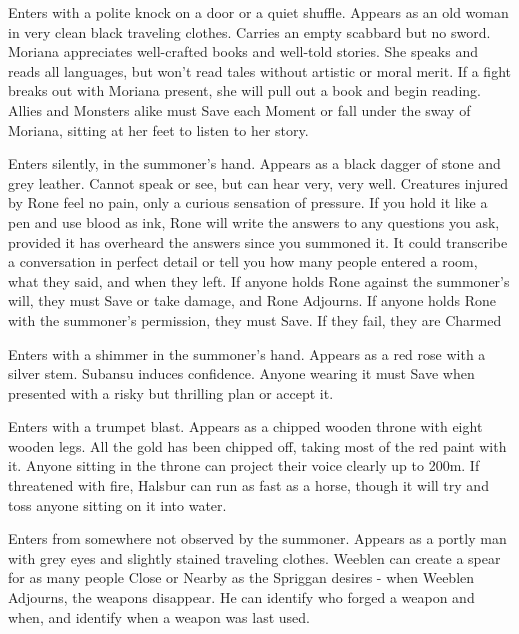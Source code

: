 {
Enters with a polite knock on a door or a quiet shuffle. Appears as an old woman in very clean black traveling clothes. Carries an empty scabbard but no sword. Moriana appreciates well-crafted books and well-told stories. She speaks and reads all languages, but won't read tales without artistic or moral merit. If a fight breaks out with Moriana present, she will pull out a book and begin reading. Allies and Monsters alike must Save each Moment or fall under the sway of Moriana, sitting at her feet to listen to her story.




Enters silently, in the summoner's hand. Appears as a black dagger of stone and grey leather. Cannot speak or see, but can hear very, very well. Creatures injured by Rone feel no pain, only a curious sensation of pressure. If you hold it like a pen and use blood as ink, Rone will write the answers to any questions you ask, provided it has overheard the answers since you summoned it. It could transcribe a conversation in perfect detail or tell you how many people entered a room, what they said, and when they left. If anyone holds Rone against the summoner's will, they must Save or take \SUMDICE damage, and Rone Adjourns. If anyone holds Rone with the summoner's permission, they must Save. If they fail, they are Charmed

Enters with a shimmer in the summoner's hand. Appears as a red rose with a silver stem. Subansu induces confidence. Anyone wearing it must Save when presented with a risky but thrilling plan or accept it. 


Enters with a trumpet blast. Appears as a chipped wooden throne with eight wooden legs. All the gold has been chipped off, taking most of the red paint with it. Anyone sitting in the throne can project their voice clearly up to 200m.  If threatened with fire, Halsbur can run as fast as a horse, though it will try and toss anyone sitting on it into water.


Enters from somewhere not observed by the summoner. Appears as a portly man with grey eyes and slightly stained traveling clothes. Weeblen can create a spear for as many people Close or Nearby as the Spriggan desires - when Weeblen Adjourns, the weapons disappear.   He can identify who forged a weapon and when, and identify when a weapon was last used. 


}
